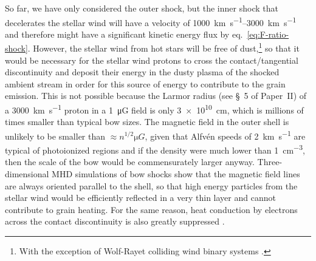So far, we have only considered the outer shock, but the inner shock
that decelerates the stellar wind will have a velocity of
\SIrange{1000}{3000}{km.s^{-1}} and therefore might have a significant
kinetic energy flux by eq.~\eqref{eq:F-ratio-shock}.  However, the
stellar wind from hot stars will be free of dust,\footnote{%
  With the exception of Wolf-Rayet colliding wind binary systems
  \citep{Tuthill:1999a, Callingham:2019a}.} %
so that it would be necessary for the stellar wind protons to cross
the contact/tangential discontinuity and deposit their energy in the
dusty plasma of the shocked ambient stream in order for this source of
energy to contribute to the grain emission.  This is not possible
because the Larmor radius (see \S~5 of Paper~II)
of a \SI{3000}{km.s^{-1}} proton in a \SI{1}{\micro G} field is only
\SI{3e10}{cm}, which is millions of times smaller than typical bow
sizes.  The magnetic field in the outer shell is unlikely to be
smaller than \(\approx n^{1/2} \si{\micro G}\), given that Alfvén speeds of
\SI{2}{km.s^{-1}} are typical of photoionized regions \citep{Arthur:2011a, Planck-Collaboration:2016c}
and if the density were much lower than
\SI{1}{cm^{-3}}, then the scale of the bow would be commensurately
larger anyway.  Three-dimensional MHD simulations of bow shocks
\citep{Katushkina:2017a, Gvaramadze:2018a} show that the magnetic
field lines are always oriented parallel to the shell, so that high
energy particles from the stellar wind would be efficiently reflected
in a very thin layer and cannot contribute to grain heating.  For the
same reason, heat conduction by electrons across the contact
discontinuity is also greatly suppressed \citep{Meyer:2017a}.



